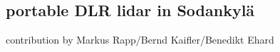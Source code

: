 \subsection{portable DLR lidar in Sodankyl\"a}
contribution by Markus Rapp/Bernd Kaifler/Benedikt Ehard